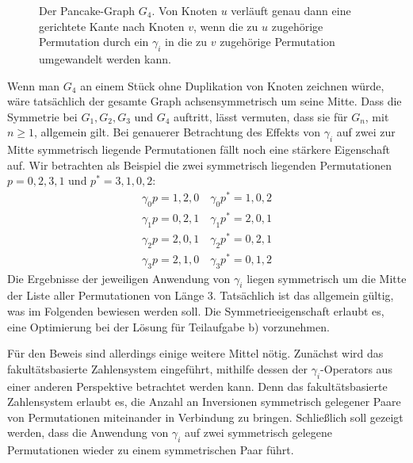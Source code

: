 \documentclass[a4paper, 10pt, ngerman]{article}
\begin{document}
\begin{figure}
    \caption{Der Pancake-Graph $G_4$. Von Knoten $u$ verläuft genau dann eine gerichtete Kante nach Knoten $v$, wenn die zu $u$ zugehörige Permutation durch ein $\gamma_i$ in die zu $v$ zugehörige Permutation umgewandelt werden kann.}
\end{figure}
\newpage

Wenn man $G_4$ an einem Stück ohne Duplikation von Knoten zeichnen würde, wäre tatsächlich der gesamte Graph achsensymmetrisch um seine Mitte. Dass die Symmetrie bei $G_1, G_2, G_3$ und $G_4$ auftritt, lässt vermuten, dass sie für $G_n$, mit $n \ge 1$, allgemein gilt. Bei genauerer Betrachtung des Effekts von $\gamma_i$ auf zwei zur Mitte symmetrisch liegende Permutationen fällt noch eine stärkere Eigenschaft auf. Wir betrachten als Beispiel die zwei symmetrisch liegenden Permutationen $p = 0,2,3,1$ und $p^* = 3, 1, 0, 2$:
\begin{align*}
    \gamma_0 p = 1, 2, 0 \quad \gamma_0 p^* = 1, 0, 2 \\
    \gamma_1 p = 0, 2, 1 \quad \gamma_1 p^* = 2, 0, 1 \\
    \gamma_2 p = 2, 0, 1 \quad \gamma_2 p^* = 0, 2, 1 \\
    \gamma_3 p = 2, 1, 0 \quad \gamma_3 p^* = 0, 1, 2
\end{align*}
Die Ergebnisse der jeweiligen Anwendung von $\gamma_i$ liegen symmetrisch um die Mitte der Liste aller Permutationen von Länge 3. Tatsächlich ist das allgemein gültig, was im Folgenden bewiesen werden soll. Die Symmetrieeigenschaft erlaubt es, eine Optimierung bei der Lösung für Teilaufgabe b) vorzunehmen.

Für den Beweis sind allerdings einige weitere Mittel nötig. Zunächst wird das fakultätsbasierte Zahlensystem eingeführt, mithilfe dessen der $\gamma_i$-Operators aus einer anderen Perspektive betrachtet werden kann. Denn das fakultätsbasierte Zahlensystem erlaubt es, die Anzahl an Inversionen symmetrisch gelegener Paare von Permutationen miteinander in Verbindung zu bringen. Schließlich soll gezeigt werden, dass die Anwendung von $\gamma_i$ auf zwei symmetrisch gelegene Permutationen wieder zu einem symmetrischen Paar führt.
\medskip
\end{document}
